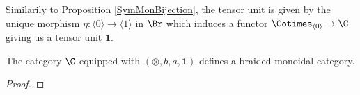 Similarily to Proposition \ref{SymMonBijection}, the tensor unit is given by the unique morphism 
$\eta \colon \langle 0 \rangle \to \langle 1 \rangle$ in $\Br$ 
which induces a functor $\Cotimes_{\langle 0 \rangle} \to \C$ giving us a tensor unit $\mathbf{1}$.

\begin{prop}
    The category $\C$ equipped with $(\otimes, b, a, \mathbf{1})$ defines a braided monoidal category.
\end{prop}

\begin{proof}




\end{proof}
